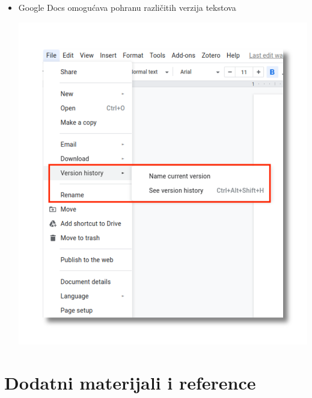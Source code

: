 \documentclass[aspectratio=169]{beamer}
\begin{document}
\begin{frame}
    \begin{itemize}
        \item Google Docs omogućava pohranu različitih verzija tekstova
            
        \vspace{1em}

        \begin{center}
            \includegraphics[scale=.30]{images/docs-vcs.png}
        \end{center}
    \end{itemize}
\end{frame}

\section{Dodatni materijali i reference}
\end{document}
